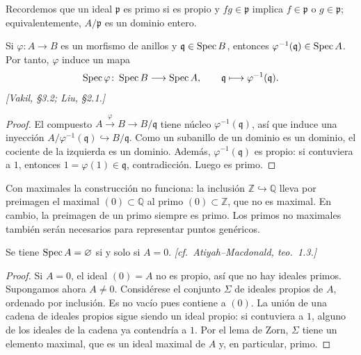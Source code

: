 Recordemos que un ideal $\mathfrak p$ es primo si es propio y $fg\in\mathfrak p$ implica $f\in\mathfrak p$ o $g\in\mathfrak p$; equivalentemente, $A/\mathfrak p$ es un dominio entero.

\begin{lema}
\label{lema:s01-preimagen-primo}
Si $\varphi\colon A\to B$ es un morfismo de anillos y $\mathfrak q\in\operatorname{Spec} B$, entonces $\varphi^{-1}(\mathfrak q)\in\operatorname{Spec} A$. Por tanto, $\varphi$ induce un mapa
\[
\operatorname{Spec}\varphi\colon \operatorname{Spec} B\longrightarrow\operatorname{Spec} A,\qquad \mathfrak q\longmapsto\varphi^{-1}(\mathfrak q).
\]
\emph{[Vakil, \S3.2; Liu, \S2.1.]}
\end{lema}
\begin{proof}
El compuesto $A\xrightarrow{\varphi}B\to B/\mathfrak q$ tiene núcleo $\varphi^{-1}(\mathfrak q)$, así que induce una inyección $A/\varphi^{-1}(\mathfrak q)\hookrightarrow B/\mathfrak q$. Como un subanillo de un dominio es un dominio, el cociente de la izquierda es un dominio. Además, $\varphi^{-1}(\mathfrak q)$ es propio: si contuviera a $1$, entonces $1=\varphi(1)\in\mathfrak q$, contradicción. Luego es primo.
\end{proof}

\begin{obs}
\label{obs:s01-primos-no-maximales}
Con maximales la construcción no funciona: la inclusión $\mathbb Z\hookrightarrow\mathbb Q$ lleva por preimagen el maximal $(0)\subset\mathbb Q$ al primo $(0)\subset\mathbb Z$, que no es maximal. En cambio, la preimagen de un primo siempre es primo. Los primos no maximales también serán necesarios para representar puntos genéricos.
\end{obs}

\begin{teo}
\label{teo:s01-espectro-vacio}
Se tiene $\operatorname{Spec} A=\varnothing$ si y solo si $A=0$. \emph{[cf.~Atiyah--Macdonald, teo.~1.3.]}
\end{teo}
\begin{proof}
Si $A=0$, el ideal $(0)=A$ no es propio, así que no hay ideales primos. Supongamos ahora $A\ne0$. Considérese el conjunto $\Sigma$ de ideales propios de $A$, ordenado por inclusión. Es no vacío pues contiene a $(0)$. La unión de una cadena de ideales propios sigue siendo un ideal propio: si contuviera a $1$, alguno de los ideales de la cadena ya contendría a $1$. Por el lema de Zorn, $\Sigma$ tiene un elemento maximal, que es un ideal maximal de $A$ y, en particular, primo.
\end{proof}

